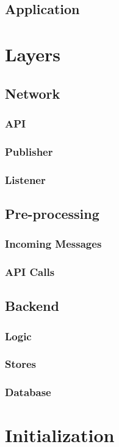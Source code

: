 \subsection{Application}


\section{Layers}
\subsection{Network}
\subsubsection{API}
\subsubsection{Publisher}
\subsubsection{Listener}
\subsection{Pre-processing}
\subsubsection{Incoming Messages}
\subsubsection{API Calls}
\subsection{Backend}
\subsubsection{Logic}
\subsubsection{Stores}
\subsubsection{Database}

\section{Initialization}
